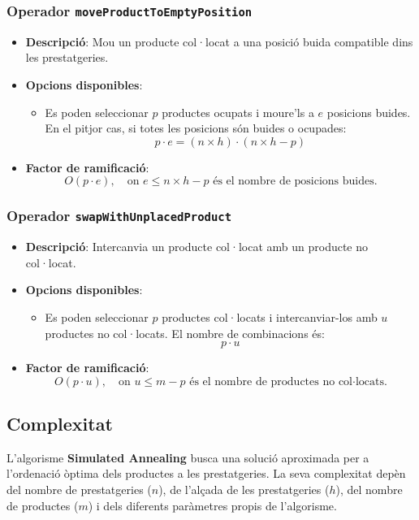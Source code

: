 \documentclass[a4paper,12pt]{report}
\begin{document}
\begin{itemize}
\subsubsection{Operador \texttt{moveProductToEmptyPosition}}
\begin{itemize}
    \item \textbf{Descripció}: Mou un producte col·locat a una posició buida compatible dins les prestatgeries.
    \item \textbf{Opcions disponibles}: 
    \begin{itemize}
        \item Es poden seleccionar \(p\) productes ocupats i moure'ls a \(e\) posicions buides. En el pitjor cas, si totes les posicions són buides o ocupades:
        \[
        p \cdot e = (n \times h) \cdot (n \times h - p)
        \]
    \end{itemize}
    \item \textbf{Factor de ramificació}:
    \[
    O(p \cdot e), \quad \text{on } e \leq n \times h - p \text{ és el nombre de posicions buides.}
    \]
\end{itemize}

\subsubsection{Operador \texttt{swapWithUnplacedProduct}}
\begin{itemize}
    \item \textbf{Descripció}: Intercanvia un producte col·locat amb un producte no col·locat.
    \item \textbf{Opcions disponibles}: 
    \begin{itemize}
        \item Es poden seleccionar \(p\) productes col·locats i intercanviar-los amb \(u\) productes no col·locats. El nombre de combinacions és:
        \[
        p \cdot u
        \]
    \end{itemize}
    \item \textbf{Factor de ramificació}:
    \[
    O(p \cdot u), \quad \text{on } u \leq m - p \text{ és el nombre de productes no col·locats.}
    \]
\end{itemize}

\subsection{Complexitat}

L'algorisme \textbf{Simulated Annealing} busca una solució aproximada per a l'ordenació òptima dels productes a les prestatgeries. La seva complexitat depèn del nombre de prestatgeries (\(n\)), de l'alçada de les prestatgeries (\(h\)), del nombre de productes (\(m\)) i dels diferents paràmetres propis de l'algorisme.


\end{itemize}
\end{document}
